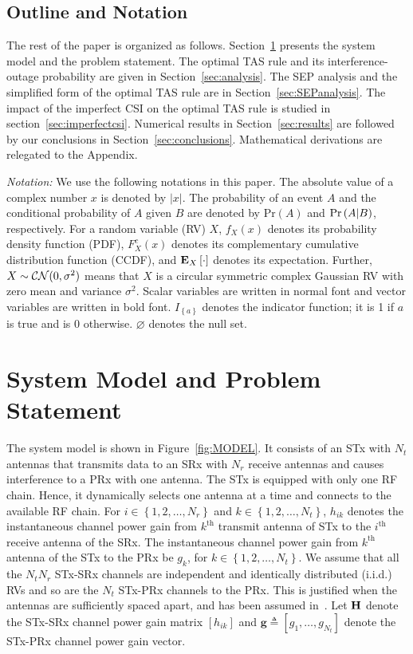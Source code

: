 \documentclass[12pt,draftcls,peerreview,onecolumn]{IEEEtran}
\newcommand{\brac}[1]{\left({#1}\right)}
\newcommand{\cbrac}[1]{\left\{{#1}\right\}}
\newcommand{\indic}[1]{I_{\cbrac{#1}}}
\newcommand{\define}{\triangleq}
\newcommand{\mtx}[1]{{\bf #1}} %
\newcommand{\explow}[2]{{\bf{E}}_{#1}\left[{#2}\right]}
\newcommand{\prob}[1]{\text{Pr}\brac{#1}}
\newcommand{\given}{\arrowvert}
\newcommand{\Nt}{{N_t}}
\newcommand{\Nr}{{N_r}}
\newcommand{\such}{h}
\newcommand{\puch}{g}
\newcommand{\hk}[1]{{\such_{#1}}}
\newcommand{\gk}[1]{{\puch_{#1}}}
\newcommand{\g}{\mathbf{\puch}}
\newcommand{\antopts}{\left\{1,2,\ldots,\Nt\right\}}
\newcommand{\nropts}{\left\{1,2,\ldots,\Nr\right\}}
\newcommand{\Hmx}{\mtx{H}}
\newcommand{\ith}{i^{\text{th}}}
\newcommand{\kth}{k^{\text{th}}}
\newcommand{\nullset}{\varnothing}
\begin{document}
\subsection{Outline and Notation}
The rest of the paper is organized as follows. Section~\ref{sec:model} presents the system model and the problem statement. The optimal TAS rule and its interference-outage probability are given in Section~\ref{sec:analysis}. The SEP analysis and the simplified form of the optimal TAS rule are  in Section~\ref{sec:SEPanalysis}. The impact of the imperfect CSI on the optimal TAS rule is studied in section~\ref{sec:imperfectcsi}. Numerical results in Section~\ref{sec:results} are followed by our conclusions in Section~\ref{sec:conclusions}. Mathematical derivations are relegated to the Appendix.

\emph{Notation:} We use the following notations in this paper. The absolute value of a complex number $x$ is denoted by $|x|$. The probability of an event $A$ and the conditional probability of $A$ given $B$ are denoted by $\prob{A}$ and $\prob{A \given B}$, respectively. For a random variable (RV) $X$, $f_{X}(x)$ denotes its probability density function (PDF), $F_{X}^{c}(x)$ denotes its complementary cumulative distribution function (CCDF), and $\explow{X}{\cdot}$ denotes its expectation. Further, $X \sim {\cal CN}(0,\sigma^2)$ means that $X$ is a circular symmetric complex Gaussian RV with zero mean and variance $\sigma^2$.  Scalar variables are written in normal font and vector variables are written in bold font. $\indic{a}$ denotes the indicator function; it is 1 if $a$ is true and is 0 otherwise. $\nullset$ denotes the null set.

\section{System Model and Problem Statement}
\label{sec:model}
The system model is shown in Figure~\ref{fig:MODEL}. It consists of an STx with $\Nt$ antennas that transmits data to an SRx with $\Nr$ receive antennas and causes interference to a PRx with one antenna. The STx is equipped with only one RF chain. Hence, it dynamically selects one antenna at a time and connects to the available RF chain. For $i \in \nropts$ and $k \in \antopts$, $\hk{ik}$ denotes the instantaneous channel power gain from $\kth$ transmit antenna of STx to the $\ith$ receive antenna of the SRx. The instantaneous channel power gain from $\kth$ antenna of the STx to the PRx be $\gk{k}$, for $k \in \antopts$. We assume that all the $\Nt\Nr$ STx-SRx channels are independent and identically distributed (i.i.d.) RVs and so are the $\Nt$ STx-PRx channels to the PRx. This is justified when the antennas are sufficiently spaced apart, and has been assumed in~\cite{Fakhan_2014_TSP,Kong_2011_JCN,Sarvendranath_2013_TCOM,Hanif_2015_globecom}. Let $\Hmx$ denote the STx-SRx channel power gain matrix $\left[\hk{ik}\right]$ and $\g\define\left[\gk{1},\ldots,\gk{\Nt}\right]$ denote the STx-PRx channel power gain vector.
\end{document}

